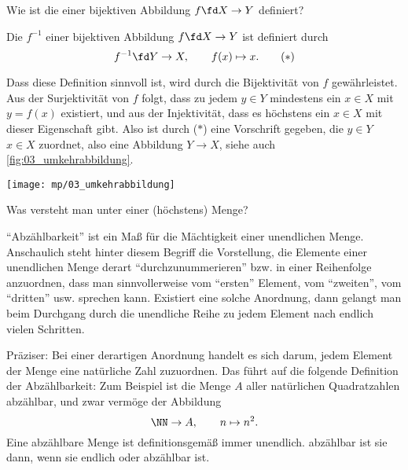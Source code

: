 \begin{frage}\label{03_umk}
  Wie ist die  einer bijektiven Abbildung 
  $f\fd X\to Y$ definiert?
\end{frage}

\begin{antwort}
  Die  $f^{-1}$ 
  einer bijektiven Abbildung $f\fd X\to Y$ ist definiert durch 
  \begin{equation}
    f^{-1}\fd Y \to X, \qquad f(x) \mapsto x. \tag{$\ast$}
  \end{equation}

  Dass diese Definition sinnvoll ist, wird durch die Bijektivität 
  von $f$ gewährleistet. Aus der Surjektivität von $f$ folgt, dass zu 
  jedem $y\in Y$ mindestens ein $x\in X$ mit $y=f(x)$ exis\-tiert, und  
  aus der Injektivität, dass es höchstens ein $x\in X$ mit dieser Eigenschaft 
  gibt. Also ist durch ($\ast$) eine Vorschrift gegeben, die 
   $y\in Y$  $x\in X$ zuordnet, also eine 
  Abbildung $Y\to X$, siehe auch \Abb\ref{fig:03_umkehrabbildung}.
  \AntEnd

  \begin{center}
    \texttt{[image: mp/03\_umkehrabbildung]}
    \label{fig:03_umkehrabbildung}
  \end{center}

\end{antwort}

\begin{frage}\label{03_abz}
  Was versteht man unter einer (höchstens)  Menge?
\end{frage}

\begin{antwort}
  "`Abzählbarkeit"' ist ein Maß für die Mächtigkeit einer 
  unendlichen Menge. Anschaulich steht hinter diesem Begriff die 
  Vorstellung, die Elemente einer unendlichen Menge derart 
  "`durchzunummerieren"' bzw. in einer  Reihenfolge anzuordnen, 
  dass man sinnvollerweise vom "`ersten"' Element, vom "`zweiten"', 
  vom "`dritten"' usw. sprechen kann. Existiert eine solche Anordnung, dann 
  gelangt man beim Durchgang durch die unendliche Reihe zu jedem Element nach 
  endlich vielen Schritten.

  Präziser: 
  Bei einer derartigen Anordnung handelt es sich darum, 
  jedem Element der Menge  
  eine natürliche Zahl zuzuordnen. 
  Das führt auf die folgende Definition der Abzählbarkeit: 
  Zum Beispiel ist die Menge $A$ aller natürlichen 
  Quadratzahlen abzählbar, und zwar vermöge der Abbildung
  \[
  \NN \to A, \qquad n \mapsto n^2.
  \]  
  Eine abzählbare Menge ist definitionsgemäß immer unendlich. 
   abzählbar ist sie dann, 
  wenn sie endlich oder abzählbar ist.
  \AntEnd
\end{antwort}

